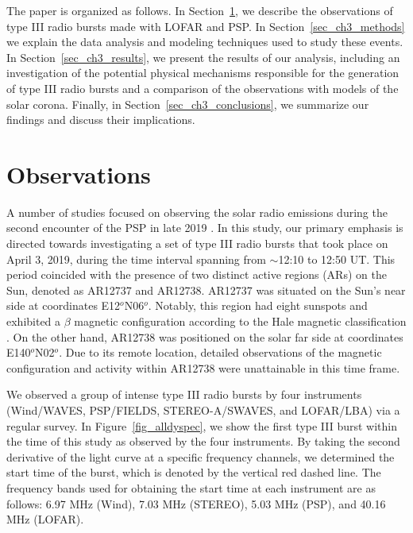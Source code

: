 The paper is organized as follows. In Section~\ref{sec_ch3_obs}, we describe the observations of type III radio bursts made with LOFAR and PSP. In Section~\ref{sec_ch3_methods} we explain the data analysis and modeling techniques used to study these events. In Section~\ref{sec_ch3_results}, we present the results of our analysis, including an investigation of the potential physical mechanisms responsible for the generation of type III radio bursts and a comparison of the observations with models of the solar corona. Finally, in Section~\ref{sec_ch3_conclusions}, we summarize our findings and discuss their implications.

\section{Observations}
\label{sec_ch3_obs}
A number of studies focused on observing the solar radio emissions during the second encounter of the PSP in late 2019 \cite{krupar_2020, pulupa_2020, cattell_2021, harra_2021, badman_2022}. In this study, our primary emphasis is directed towards investigating a set of type III radio bursts that took place on April 3, 2019, during the time interval spanning from $\sim$12:10 to 12:50 UT. This period coincided with the presence of two distinct active regions (ARs) on the Sun, denoted as AR12737 and AR12738. 
AR12737 was situated on the Sun's near side at coordinates E12$^o$N06$^o$. Notably, this region had eight sunspots and exhibited a $\beta$ magnetic configuration according to the Hale magnetic classification \cite{hale_2019}. On the other hand, AR12738 was positioned on the solar far side at coordinates E140$^o$N02$^o$. Due to its remote location, detailed observations of the magnetic configuration and activity within AR12738 were unattainable in this time frame.

We observed a group of intense type III radio bursts by four instruments (Wind/WAVES, PSP/FIELDS, STEREO-A/SWAVES, and LOFAR/LBA) via a regular survey. In Figure~\ref{fig_alldyspec}, we show the first type III burst within the time of this study as observed by the four instruments. By taking the second derivative of the light curve at a specific frequency channels, we determined the start time of the burst, which is denoted by the vertical red dashed line. The frequency bands used for obtaining the start time at each instrument are as follows: 6.97 MHz (Wind), 7.03 MHz (STEREO), 5.03 MHz (PSP), and 40.16 MHz (LOFAR).

